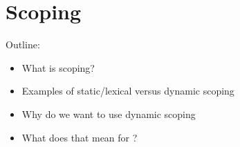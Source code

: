\section{Scoping}

Outline:

\begin{itemize}[noitemsep]
\item What is scoping?
\item Examples of static/lexical versus dynamic scoping
\item Why do we want to use dynamic scoping
\item What does that mean for \productname?
\end{itemize}
